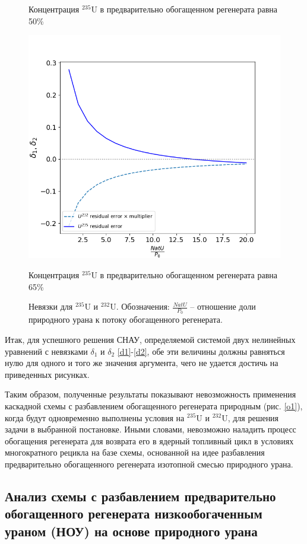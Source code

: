 \begin{figure}[ht]
\begin{minipage}{.5\textwidth}
    \caption{Концентрация $^{235}$U в предварительно обогащенном регенерата равна 50\%}
  \end{minipage}
  \begin{minipage}{.5\textwidth}
    \centering
    \includegraphics[width=.8\linewidth]{images/plots/65}  
    \caption{Концентрация $^{235}$U в предварительно обогащенном регенерата равна 65\%}
  \end{minipage}
  \caption{Невязки для $^{235}$U и $^{232}$U. Обозначения: $\frac{NatU}{P_{0}}$ -- отношение доли природного урана к потоку обогащенного регенерата.}
  \label{fig:deltas_ordinar}
 \end{figure}

Итак, для успешного решения СНАУ, определяемой системой двух нелинейных уравнений с невязками $\delta_1$ и $\delta_2$ \ref{d1}-\ref{d2}, обе эти величины должны равняться нулю для одного и того же значения аргумента, чего не удается достичь на приведенных рисунках.

Таким образом, полученные результаты показывают невозможность применения каскадной схемы с разбавлением обогащенного регенерата природным (рис. \ref{o1}), когда будут одновременно выполнены условия на $^{235}$U и $^{232}$U, для решения задачи в выбранной постановке. Иными словами, невозможно наладить процесс обогащения регенерата для возврата его в ядерный топливный цикл в условиях многократного рецикла на базе схемы, основанной на идее разбавления предварительно обогащенного регенерата изотопной смесью природного урана.

\subsection{Анализ схемы с разбавлением предварительно обогащенного регенерата низкообогаченным ураном (НОУ) на основе природного урана}

